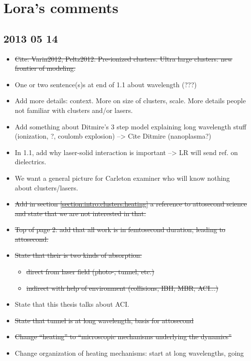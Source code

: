 \section*{Lora's comments}

\subsection*{2013 05 14}

\begin{itemize}
\item \sout{Cite: Varin2012, Peltz2012. Pre-ionized
clusters. Ultra large clusters: new frontier of modeling.}
\item One or two sentence(s)s at end of 1.1 about wavelength (???)
\item Add more details: context. More on size of clusters, scale. More details
people not familiar with clusters and/or lasers.
\item Add something about Ditmire's 3 step model explaining long wavelength stuff
(ionization, ?, coulomb explosion) --> Cite Ditmire (nanoplasma?)
\item In 1.1, add why laser-solid interaction is important --> LR will send ref.
on dielectrics.
\item We want a general picture for Carleton examiner who will know nothing about
clusters/lasers.
\item \sout{Add in section \ref{section:intro:clusters:heating} a reference to
attosecond science and state that we are not interested in that.}
\item \sout{Top of page 2: add that all work is in femtosecond duration, leading to
attosecond.}
\item \sout{State that their is two kinds of absorption:}
    \begin{itemize}
    \item \sout{direct from laser field (photo-, tunnel, etc.)}
    \item \sout{indirect with help of environment (collisions, IBH, MBR, ACI...)}
    \end{itemize}
\item State that this thesis talks about ACI.
\item \sout{State that tunnel is at long wavelength, basis for attosecond}
\item \sout{Change ``heating'' to ``microscopic mechanisms underlying the dynamics''}
\item Change organization of heating mechanisms: start at long wavelengths, going

\end{itemize}
